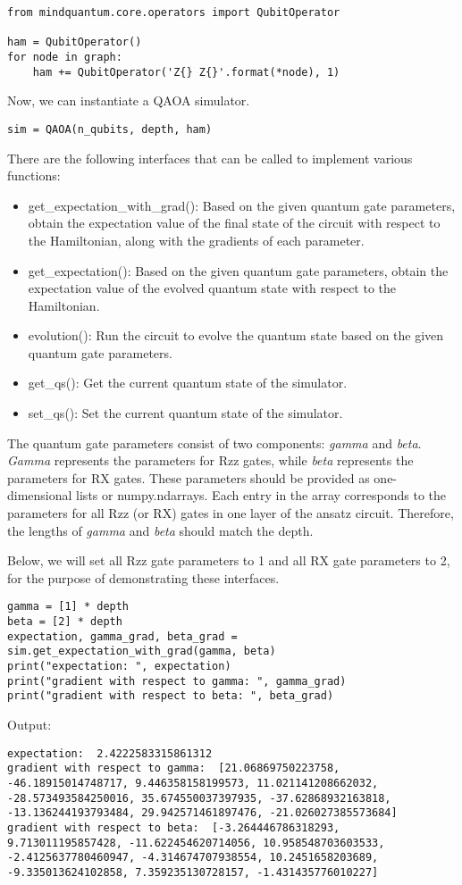 \begin{lstlisting}
from mindquantum.core.operators import QubitOperator

ham = QubitOperator()
for node in graph:
    ham += QubitOperator('Z{} Z{}'.format(*node), 1)
\end{lstlisting}

Now, we can instantiate a QAOA simulator.
\begin{lstlisting}
sim = QAOA(n_qubits, depth, ham)
\end{lstlisting}

There are the following interfaces that can be called to implement various functions:

\begin{itemize}
    \item get\_expectation\_with\_grad(): Based on the given quantum gate parameters, obtain the expectation value of the final state of the circuit with respect to the Hamiltonian, along with the gradients of each parameter.
    \item get\_expectation(): Based on the given quantum gate parameters, obtain the expectation value of the evolved quantum state with respect to the Hamiltonian.
    \item evolution(): Run the circuit to evolve the quantum state based on the given quantum gate parameters.
    \item get\_qs(): Get the current quantum state of the simulator.
    \item set\_qs(): Set the current quantum state of the simulator.
\end{itemize}

The quantum gate parameters consist of two components: \textit{gamma} and \textit{beta}. \textit{Gamma} represents the parameters for Rzz gates, while \textit{beta} represents the parameters for RX gates. These parameters should be provided as one-dimensional lists or numpy.ndarrays. Each entry in the array corresponds to the parameters for all Rzz (or RX) gates in one layer of the ansatz circuit. Therefore, the lengths of \textit{gamma} and \textit{beta} should match the depth.

Below, we will set all Rzz gate parameters to 1 and all RX gate parameters to 2, for the purpose of demonstrating these interfaces.

\begin{lstlisting}
gamma = [1] * depth
beta = [2] * depth
expectation, gamma_grad, beta_grad = sim.get_expectation_with_grad(gamma, beta)
print("expectation: ", expectation)
print("gradient with respect to gamma: ", gamma_grad)
print("gradient with respect to beta: ", beta_grad)
\end{lstlisting}
Output:
\begin{lstlisting}
expectation:  2.4222583315861312
gradient with respect to gamma:  [21.06869750223758, -46.18915014748717, 9.446358158199573, 11.021141208662032, -28.573493584250016, 35.674550037397935, -37.62868932163818, -13.136244193793484, 29.942571461897476, -21.026027385573684]
gradient with respect to beta:  [-3.264446786318293, 9.713011195857428, -11.622454620714056, 10.958548703603533, -2.4125637780460947, -4.314674707938554, 10.2451658203689, -9.335013624102858, 7.359235130728157, -1.431435776010227]
\end{lstlisting}
